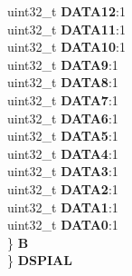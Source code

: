 \begin{DoxyCompactItemize}
\begin{tabbing}
\>\>uint32\_t {\bfseries DATA12}:1\\
\>\>uint32\_t {\bfseries DATA11}:1\\
\>\>uint32\_t {\bfseries DATA10}:1\\
\>\>uint32\_t {\bfseries DATA9}:1\\
\>\>uint32\_t {\bfseries DATA8}:1\\
\>\>uint32\_t {\bfseries DATA7}:1\\
\>\>uint32\_t {\bfseries DATA6}:1\\
\>\>uint32\_t {\bfseries DATA5}:1\\
\>\>uint32\_t {\bfseries DATA4}:1\\
\>\>uint32\_t {\bfseries DATA3}:1\\
\>\>uint32\_t {\bfseries DATA2}:1\\
\>\>uint32\_t {\bfseries DATA1}:1\\
\>\>uint32\_t {\bfseries DATA0}:1\\
\>\} {\bfseries B}\\
\} {\bfseries DSPIAL}\\


\end{tabbing}
\end{DoxyCompactItemize}
